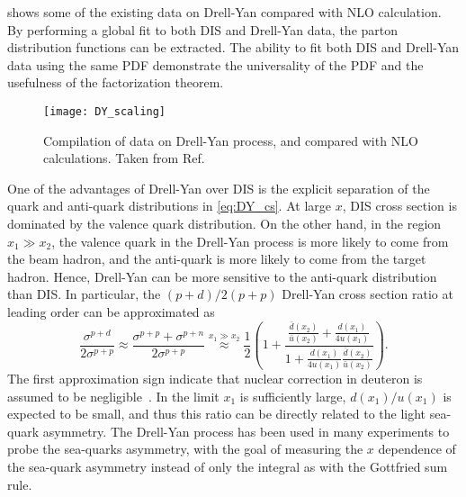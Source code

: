 \documentclass[../main.tex]{subfiles}
\begin{document}
 shows some of the existing data on Drell-Yan compared with NLO calculation. By
performing a global fit to both DIS and Drell-Yan data, the parton distribution
functions can be extracted. The ability to fit both DIS and Drell-Yan data using
the same PDF demonstrate the universality of the PDF and the usefulness of the
factorization theorem.
\begin{figure}[htbp!]
	\centering
	\texttt{[image: DY\_scaling]}
	\caption{Compilation of data on Drell-Yan process, and compared with NLO calculations.
		Taken from Ref.~\cite{mcgaughey1999}}
	\label{fig:DY_scaling}
\end{figure}

One of the advantages of Drell-Yan over DIS is the explicit separation of the quark
and anti-quark distributions in \cref{eq:DY_cs}. At large $x$, DIS cross section
is dominated by the valence quark distribution. On the other hand, in the region $x_1 \gg x_2$,
the valence quark in the Drell-Yan process is more likely to come from the beam
hadron, and the anti-quark is more likely to come from the target hadron. Hence,
Drell-Yan can be more sensitive to the anti-quark distribution than DIS. In
particular, the $(p+d)/2(p+p)$ Drell-Yan cross section ratio at leading order
can be approximated as
\begin{equation}
	\frac{\sigma^{p+d}}{2\sigma^{p+p}}\approx \frac{\sigma^{p+p}+\sigma^{p+n}}{2\sigma^{p+p}}
	\stackrel{x_1\gg x_2}{\approx} \frac{1}{2} \left( 1+ \frac{\frac{\bar{d}\left(x_2\right)}{\bar{u}\left(x_2\right)} + \frac{d\left(x_1\right)}{4u\left(x_1\right)} }{1+\frac{d\left(x_1\right)}{4u\left(x_1\right)} \frac{\bar{d}\left(x_2\right)}{\bar{u}\left(x_2\right)} }\right).
\end{equation}
The first approximation sign indicate that nuclear correction in deuteron is assumed to be negligible~\cite{ehlers2014}.
In the limit $x_1$ is sufficiently large, $d\left(x_1\right)/u\left(x_1\right)$ is expected
to be small, and thus this ratio can be directly related to the light sea-quark
asymmetry. The Drell-Yan process has been used in many experiments to probe the sea-quarks
asymmetry, with the goal of measuring the $x$ dependence of the sea-quark asymmetry
instead of only the integral as with the Gottfried sum rule.
\end{document}
